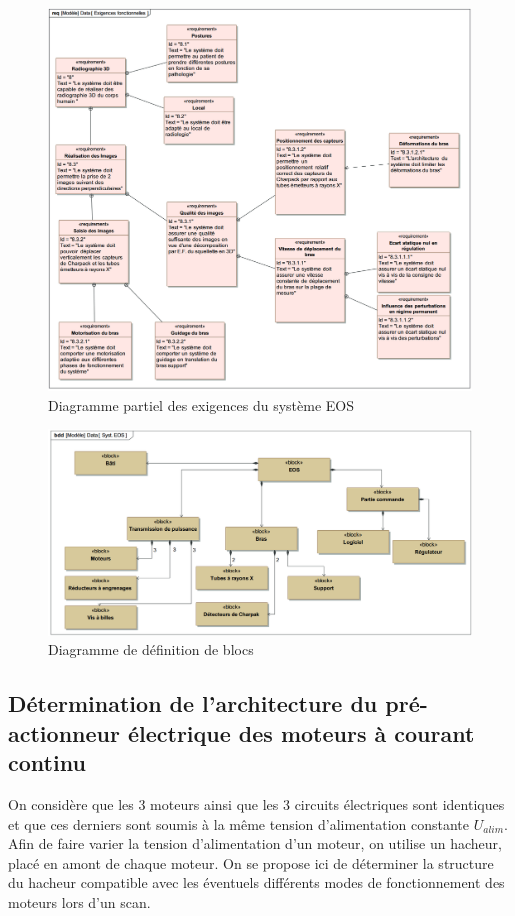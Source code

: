 \begin{figure}[!h]
 \centering \includegraphics[width=0.8\linewidth]{img/td02_05}
 \caption{Diagramme partiel des exigences du système EOS}
 \label{td02_05}
\end{figure}

\begin{figure}[!h]
 \centering \includegraphics[width=0.8\linewidth]{img/td02_06}
 \caption{Diagramme de définition de blocs}
 \label{td02_06}
\end{figure}

\newpage

\subsection{Détermination de l'architecture du pré-actionneur électrique des moteurs à courant continu}

On considère que les 3 moteurs ainsi que les 3 circuits électriques sont identiques et que ces derniers sont
soumis à la même tension d'alimentation constante $U_{alim}$. Afin de faire varier la tension d'alimentation d'un moteur, on utilise un hacheur, placé en amont de chaque moteur. On se propose ici de déterminer la structure du hacheur compatible avec les éventuels différents modes de fonctionnement des moteurs lors d'un scan.

